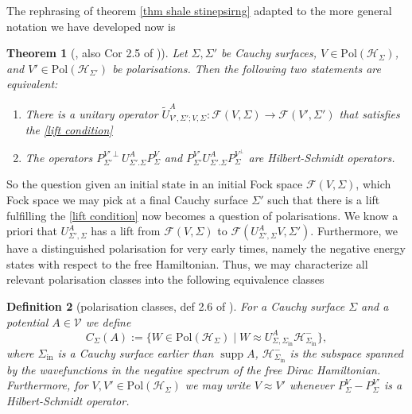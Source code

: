\documentclass[b5paper,draft,openbib,12pt]{memoir}
\newtheorem{Def}{Definition}
\newtheorem{Thm}[Def]{Theorem}
\DeclareMathOperator*{\supp}{supp}
\begin{document}
The rephrasing of theorem \ref{thm shale stinepsirng} 
adapted to the more general notation we have developed now is
\begin{Thm}[\cite{ivp2}, also Cor 2.5 of \cite{deckert2016perspective})]
Let \(\Sigma, \Sigma'\) be Cauchy surfaces, 
\(V\in \text{Pol}(\mathcal{H}_\Sigma)\), and 
\(V'\in \text{Pol}(\mathcal{H}_{\Sigma'})\) be polarisations. 
Then the following two statements are equivalent:
\begin{enumerate}[label=\alph*)]
\item There is a unitary operator 
\(\tilde{U}^A_{V',\Sigma';V, \Sigma}:
\mathcal{F}(V,\Sigma)\rightarrow \mathcal{F}(V',\Sigma')\)
that satisfies the \eqref{lift condition}
\item The operators 
\(P^{{V'}\perp}_{\Sigma'}U^A_{\Sigma'.\Sigma}P^{{V}}_{\Sigma}\) and
\(P^{{V'}}_{\Sigma'}U^A_{\Sigma'.\Sigma}P^{{V}^\perp}_{\Sigma}\) are 
Hilbert-Schmidt operators.
\end{enumerate}
\end{Thm}

So the question given an initial state in an initial Fock space 
\(\mathcal{F}(V,\Sigma)\),
which Fock space we may pick at a final Cauchy surface \(\Sigma'\)
such that there is a lift fulfilling the \eqref{lift condition}
now becomes a question of polarisations. We know a priori 
that \(U^A_{\Sigma',\Sigma}\) has a lift from 
\(\mathcal{F}(V,\Sigma)\) to 
\(\mathcal{F}(U^A_{\Sigma',\Sigma}V,\Sigma')\). Furthermore, we have a 
distinguished polarisation for very early times, namely the negative 
energy states with respect to the free Hamiltonian. Thus, we may 
characterize all relevant polarisation classes into the following
equivalence classes 

\begin{Def}[polarisation classes, def 2.6 of \cite{deckert2016perspective}]\label{def pol class}
For a Cauchy surface \(\Sigma\) and a potential \(A\in\mathcal{V}\) 
we define 
\begin{equation}
C_{\Sigma}(A):=\big\{W\in\text{Pol}(\mathcal{H}_\Sigma)\mid 
W \approx U^A_{\Sigma,\Sigma_{\mathrm{in}}}\mathcal{H}^-_{\Sigma_{\mathrm{in}}}\big\},
\end{equation}
where \(\Sigma_{\mathrm{in}}\) is a Cauchy surface earlier than \(\supp A\),
\(\mathcal{H}^-_{\Sigma_{\text{in}}}\) is the subspace spanned by the wavefunctions 
in the negative spectrum of the free Dirac Hamiltonian. Furthermore, for 
\(V,V'\in\text{Pol}(\mathcal{H}_{\Sigma})\) we may write \(V\approx V'\)
whenever \(P^V_{\Sigma}-P^{V'}_{\Sigma}\) is a Hilbert-Schmidt operator. 
\end{Def}
\end{document}
